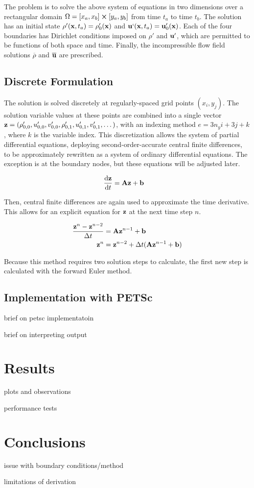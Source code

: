 \documentclass{article}
\begin{document}
The problem is to solve the above system of equations in two dimensions over a rectangular domain $\Omega = [x_{a}, x_{b}] \cross [y_{a}, y_{b}]$ from time $t_{a}$ to time $t_{b}$. The solution has an initial state $\rho'(\vb{x}, t_{a}) = \rho'_{0}(\vb{x})$ and $\vb{u}`(\vb{x}, t_{a}) = \vb{u}'_{0}(\vb{x})$. Each of the four boundaries has Dirichlet conditions imposed on $\rho'$ and $\vb{u}'$, which are permitted to be functions of both space and time. Finally, the incompressible flow field solutions $\overline{\rho}$ and $\overline{\vb{u}}$ are prescribed.

\subsection{Discrete Formulation}

The solution is solved discretely at regularly-spaced grid points $(x_{i}, y_{j})$. The solution variable values at these points are combined into a single vector $\vb{z} = (\rho'_{0, 0}, u'_{0, 0}, v'_{0, 0}, \rho'_{0, 1}, u'_{0, 1}, v'_{0, 1}, \dots)$, with an indexing method $e = 3 n_{y} i + 3j + k$, where $k$ is the variable index. This discretization allows the system of partial differential equations, deploying second-order-accurate central finite differences, to be approximately rewritten as a system of ordinary differential equations. The exception is at the boundary nodes, but these equations will be adjusted later.

\begin{align}
	\dv{\vb{z}}{t} &= \vb{A} \vb{z} + \vb{b}
\end{align}

Then, central finite differences are again used to approximate the time derivative. This allows for an explicit equation for $\vb{z}$ at the next time step $n$.

\begin{align}
	\frac{\vb{z}^{n} - \vb{z}^{n - 2}}{\Delta t} &= \vb{A} \vb{z}^{n - 1} + \vb{b} \\
	\vb{z}^{n} &= \vb{z}^{n - 2} + \Delta t (\vb{A} \vb{z}^{n - 1} + \vb{b})
\end{align}

Because this method requires two solution steps to calculate, the first new step is calculated with the forward Euler method.

\subsection{Implementation with PETSc}

brief on petsc implementatoin

brief on interpreting output

\section{Results}

plots and observations

performance tests

\section{Conclusions}

issue with boundary conditions/method

limitations of derivation
\end{document}
